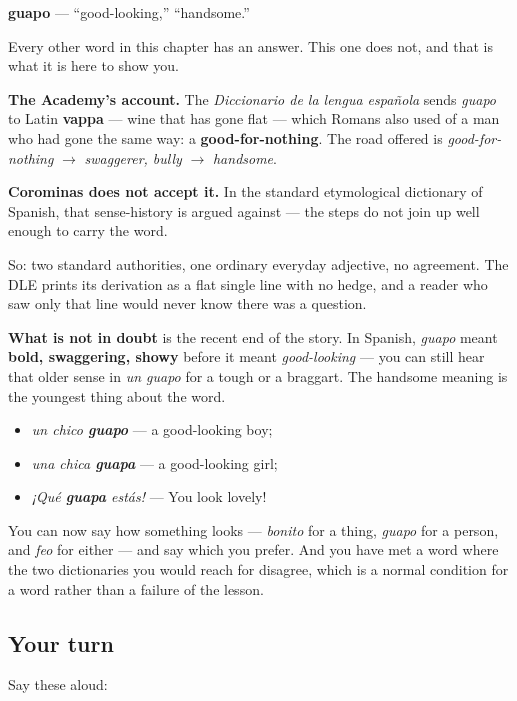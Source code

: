 \begin{cousinweb}
\textbf{guapo} — \textquotedblleft{}good-looking,\textquotedblright{} \textquotedblleft{}handsome.\textquotedblright{}

Every other word in this chapter has an answer. This one does not, and that is what it is here to show you.

\textbf{The Academy's account.} The \emph{Diccionario de la lengua española} sends \emph{guapo} to Latin \textbf{vappa} — wine that has gone flat — which Romans also used of a man who had gone the same way: a \textbf{good-for-nothing}. The road offered is \emph{good-for-nothing} $\to$ \emph{swaggerer, bully} $\to$ \emph{handsome}.

\textbf{Corominas does not accept it.} In the standard etymological dictionary of Spanish, that sense-history is argued against — the steps do not join up well enough to carry the word.

So: two standard authorities, one ordinary everyday adjective, no agreement. The DLE prints its derivation as a flat single line with no hedge, and a reader who saw only that line would never know there was a question.

\textbf{What is not in doubt} is the recent end of the story. In Spanish, \emph{guapo} meant \textbf{bold, swaggering, showy} before it meant \emph{good-looking} — you can still hear that older sense in \emph{un guapo} for a tough or a braggart. The handsome meaning is the youngest thing about the word.

\begin{itemize}
\raggedright
  \item \emph{un chico \textbf{guapo}} — a good-looking boy;
  \item \emph{una chica \textbf{guapa}} — a good-looking girl;
  \item \emph{¡Qué \textbf{guapa} estás!} — You look lovely!
\end{itemize}
\end{cousinweb}

\begin{grammarlens}[title={What you've built}]
You can now say how something looks — \emph{bonito} for a thing, \emph{guapo} for a person, and \emph{feo} for either — and say which you prefer. And you have met a word where the two dictionaries you would reach for disagree, which is a normal condition for a word rather than a failure of the lesson.
\end{grammarlens}

\subsection*{Your turn}
Say these aloud:

